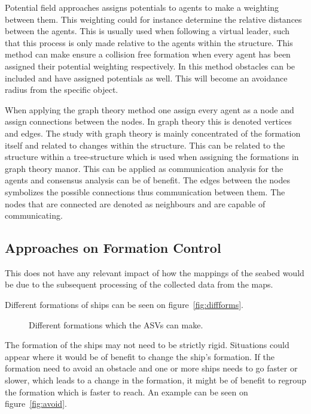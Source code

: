 \begin{description}[style=nextline]
	Potential field approaches assigns potentials to agents to make a weighting between them. This weighting could for instance determine the relative distances between the agents. This is usually used when following a virtual leader, such that this process is only made relative to the agents within the structure. This method can make ensure a collision free formation when every agent has been assigned their potential weighting respectively. In this method obstacles can be included and have assigned potentials as well. This will become an avoidance radius from the specific object.
	\item [Graph Theory Approaches]
	When applying the graph theory method one assign every agent as a node and assign connections between the nodes. In graph theory this is denoted vertices and edges. The study with graph theory is mainly concentrated of the formation itself and related to changes within the structure. This can be related to the structure within a tree-structure which is used when assigning the formations in graph theory manor. This can be applied as communication analysis for the agents and consensus analysis can be of benefit. The edges between the nodes symbolizes the possible connections thus communication between them. The nodes that are connected are denoted as neighbours and are capable of communicating.
\end{description}

\subsection{Approaches on Formation Control}


This does not have any relevant impact of how the mappings of the seabed would be due to the subsequent processing of the collected data from the maps.

Different formations of ships can be seen on figure~\vref{fig:diffforms}.
\begin{figure}[htbp]
	\centering
	
	\caption{Different formations which the \ac{ASV}s can make.}
	\label{fig:diffforms}
\end{figure}

The formation of the ships may not need to be strictly rigid. Situations could appear where it would be of benefit to change the ship's formation. If the formation need to avoid an obstacle and one or more ships needs to go faster or slower, which leads to a change in the formation, it might be of benefit to regroup the formation which is faster to reach. An example can be seen on figure~\vref{fig:avoid}.

